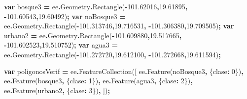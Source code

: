 \documentclass[
  12pt,
  letterpaper,
  twoside]{book}
\newenvironment{Shaded}{\begin{snugshade}}{\end{snugshade}}
\newcommand{\AttributeTok}[1]{\textcolor[rgb]{0.77,0.63,0.00}{#1}}
\newcommand{\DecValTok}[1]{\textcolor[rgb]{0.00,0.00,0.81}{#1}}
\newcommand{\FloatTok}[1]{\textcolor[rgb]{0.00,0.00,0.81}{#1}}
\newcommand{\FunctionTok}[1]{\textcolor[rgb]{0.00,0.00,0.00}{#1}}
\newcommand{\KeywordTok}[1]{\textcolor[rgb]{0.13,0.29,0.53}{\textbf{#1}}}
\newcommand{\NormalTok}[1]{#1}
\newcommand{\OperatorTok}[1]{\textcolor[rgb]{0.81,0.36,0.00}{\textbf{#1}}}
\newcommand{\StringTok}[1]{\textcolor[rgb]{0.31,0.60,0.02}{#1}}
\begin{document}
\begin{Shaded}
\begin{Highlighting}[]
\KeywordTok{var}\NormalTok{ bosque3 }\OperatorTok{=}\NormalTok{ ee}\OperatorTok{.}\AttributeTok{Geometry}\OperatorTok{.}\FunctionTok{Rectangle}\NormalTok{(}\OperatorTok{{-}}\FloatTok{101.62016}\OperatorTok{,}\FloatTok{19.61895}\OperatorTok{,} 
  \OperatorTok{{-}}\FloatTok{101.60543}\OperatorTok{,}\FloatTok{19.60492}\NormalTok{)}\OperatorTok{;}
\KeywordTok{var}\NormalTok{ noBosque3 }\OperatorTok{=}\NormalTok{ ee}\OperatorTok{.}\AttributeTok{Geometry}\OperatorTok{.}\FunctionTok{Rectangle}\NormalTok{(}\OperatorTok{{-}}\FloatTok{101.313746}\OperatorTok{,}\FloatTok{19.716531}\OperatorTok{,} 
  \OperatorTok{{-}}\FloatTok{101.306380}\OperatorTok{,}\FloatTok{19.709505}\NormalTok{)}\OperatorTok{;}
\KeywordTok{var}\NormalTok{ urbano2 }\OperatorTok{=}\NormalTok{ ee}\OperatorTok{.}\AttributeTok{Geometry}\OperatorTok{.}\FunctionTok{Rectangle}\NormalTok{(}\OperatorTok{{-}}\FloatTok{101.609880}\OperatorTok{,}\FloatTok{19.517665}\OperatorTok{,} 
  \OperatorTok{{-}}\FloatTok{101.602523}\OperatorTok{,}\FloatTok{19.510752}\NormalTok{)}\OperatorTok{;}
\KeywordTok{var}\NormalTok{ agua3 }\OperatorTok{=}\NormalTok{ ee}\OperatorTok{.}\AttributeTok{Geometry}\OperatorTok{.}\FunctionTok{Rectangle}\NormalTok{(}\OperatorTok{{-}}\FloatTok{101.272720}\OperatorTok{,}\FloatTok{19.612100}\OperatorTok{,} 
  \OperatorTok{{-}}\FloatTok{101.272668}\OperatorTok{,}\FloatTok{19.611594}\NormalTok{)}\OperatorTok{;}

\KeywordTok{var}\NormalTok{ poligonosVerif }\OperatorTok{=}\NormalTok{ ee}\OperatorTok{.}\FunctionTok{FeatureCollection}\NormalTok{([}
\NormalTok{  ee}\OperatorTok{.}\FunctionTok{Feature}\NormalTok{(noBosque3}\OperatorTok{,}\NormalTok{ \{}\StringTok{\textquotesingle{}clase\textquotesingle{}}\OperatorTok{:} \DecValTok{0}\NormalTok{\})}\OperatorTok{,}
\NormalTok{  ee}\OperatorTok{.}\FunctionTok{Feature}\NormalTok{(bosque3}\OperatorTok{,}\NormalTok{ \{}\StringTok{\textquotesingle{}clase\textquotesingle{}}\OperatorTok{:} \DecValTok{1}\NormalTok{\})}\OperatorTok{,}
\NormalTok{  ee}\OperatorTok{.}\FunctionTok{Feature}\NormalTok{(agua3}\OperatorTok{,}\NormalTok{ \{}\StringTok{\textquotesingle{}clase\textquotesingle{}}\OperatorTok{:} \DecValTok{2}\NormalTok{\})}\OperatorTok{,}
\NormalTok{  ee}\OperatorTok{.}\FunctionTok{Feature}\NormalTok{(urbano2}\OperatorTok{,}\NormalTok{ \{}\StringTok{\textquotesingle{}clase\textquotesingle{}}\OperatorTok{:} \DecValTok{3}\NormalTok{\})}\OperatorTok{,}
\NormalTok{])}\OperatorTok{;}
\end{Highlighting}
\end{Shaded}
\end{document}
